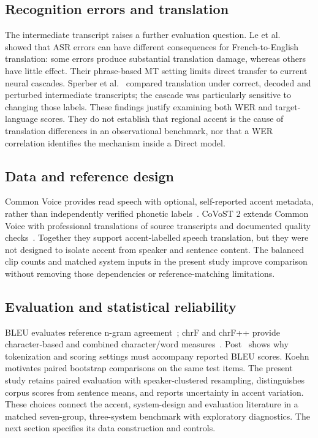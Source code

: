 \subsection{Recognition errors and translation}
The intermediate transcript raises a further evaluation question.
Le et al.~\cite{le2017disentangling} showed that ASR errors can have different
consequences for French-to-English translation: some errors produce substantial
translation damage, whereas others have little effect. Their phrase-based MT
setting limits direct transfer to current neural cascades.
Sperber et al.~\cite{sperber2019} compared translation under correct, decoded
and perturbed intermediate transcripts; the cascade was particularly sensitive
to changing those labels. These findings justify examining both WER and
target-language scores. They do not establish that regional accent is the cause of
translation differences in an observational benchmark, nor that a WER
correlation identifies the mechanism inside a Direct model.

\subsection{Data and reference design}
Common Voice provides read speech with optional, self-reported accent metadata,
rather than independently verified phonetic labels~\cite{ardila2020commonvoice}.
CoVoST 2 extends Common Voice with professional translations of source
transcripts and documented quality checks~\cite{wang2021covost2}. Together they
support accent-labelled speech translation, but they were not designed to
isolate accent from speaker and sentence content. The balanced clip counts and
matched system inputs in the present study improve comparison without removing those
dependencies or reference-matching limitations.

\subsection{Evaluation and statistical reliability}
BLEU evaluates reference n-gram agreement~\cite{papineni2002bleu}; chrF and chrF++
provide character-based and combined character/word
measures~\cite{popovic2015chrf,popovic2017chrfpp}. Post~\cite{post2018clarity}
shows why tokenization and scoring settings must accompany reported BLEU scores.
Koehn~\cite{koehn2004significance} motivates paired bootstrap comparisons on the
same test items. The present study retains paired evaluation with speaker-clustered
resampling, distinguishes corpus scores from sentence means, and reports uncertainty in accent
variation. These choices connect the accent, system-design and evaluation
literature in a matched seven-group, three-system benchmark with exploratory
diagnostics. The next section specifies its data construction and controls.
